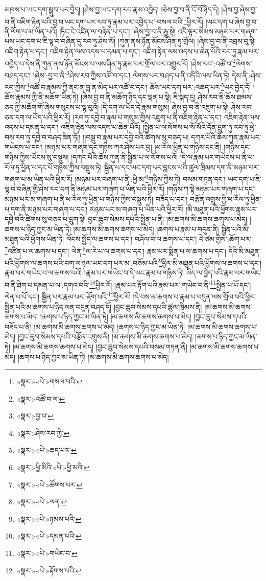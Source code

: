 མཁས་པ་ཡང་དག་སྒྲུབ་པར་བྱེད། །ཤེས་བྱ་ཡང་དག་རབ་རྣམ་འབྱེད། །ཅེས་བྱ་བ་ནི་ངོ་བོ་ཉིད་དེ། །ཤེས་བྱ་ཞེས་བྱ་བ་ནི་འཇིག་རྟེན་པའི་བྱ་བ་ཡང་དག་པར་རབ་ཏུ་རྣམ་པར་འབྱེད་པ་:བསལ་བའི་\footnote{«སྣར་»«པེ་»གསལ་བའི་}ཕྱིར་རོ། །ཡང་དག་པ་ཞེས་བྱ་བ་ནི་ལོག་པ་མ་ཡིན་པའོ། །ཏིང་ངེ་འཛིན་ལ་བརྟེན་པ་དང་། །ཞེས་བྱ་བ་ནི་རྒྱུ་སྟེ། འདི་ལྟར་སེམས་མཉམ་པར་གཞག་པས་ཡང་དག་པ་ཇི་ལྟ་བ་བཞིན་དུ་རབ་ཏུ་ཤེས་སོ། །ཀུན་ནས་ཉོན་མོངས་ཤིན་ཏུ་གྲོལ། །ཞེས་བྱ་བ་ནི་འབྲས་བུ་སྟེ། འཇིག་རྟེན་པ་དང་། འཇིག་རྟེན་ལས་འདས་པ་དམན་པ་དང་། འཇིག་རྟེན་ལས་འདས་པ་ཆེན་པོའི་རབ་ཏུ་རྣམ་པར་འབྱེད་པ་དེས་ནི་ཀུན་ནས་ཉོན་མོངས་པ་ལས་ཤིན་ཏུ་རྣམ་པར་གྲོལ་བར་འགྱུར་རོ། །ཤེས་རབ་:འཚོ་བ་\footnote{«སྣར་»འཚོ་བ་ལ་}ལེགས་བཤད་དང་། །ཞེས་:བྱ་བ་ནི་\footnote{«སྣར་»བྱ་བ་}ཤེས་རབ་ཀྱིས་འཚོ་བ་དང་། ལེགས་པར་བཤད་པ་ནི་འདིའི་ལས་ཡིན་ཏེ། དེས་ནི་:ཤེས་རབ་ཀྱིས་\footnote{«སྣར་»ཤེས་རབ་ཀྱི་}འཚོ་བ་རྣམས་ཀྱི་ནང་ན་བླ་ན་མེད་པར་འཚོ་བ་དང་། ཆོས་ཡང་དག་པར་:འཆད་པར་\footnote{«སྣར་»«པེ་»ཆད་པར་}ཡང་བྱེད་དོ། །ཆོས་རྣམས་ཀྱི་ནི་མཆོག་ཡིན་ཏེ། །ཞེས་བྱ་བ་ནི་མཆོག་ཉིད་དང་ལྡན་པ་སྟེ། ཇི་སྐད་དུ། ཤེས་རབ་ནི་ཆོས་ཐམས་ཅད་ཀྱི་མཆོག་གོ་ཞེས་གསུངས་པ་ལྟ་བུའོ། །དེ་དག་ལ་ཡོད་དེ་རྣམ་གསུམ། ཞེས་བྱ་བ་ནི་འཇུག་པ་སྟེ། ཤེས་རབ་ཅན་དག་ལ་ཡོད་པའི་ཕྱིར་རོ། །རབ་ཏུ་དབྱེ་བ་རྣམ་པ་གསུམ་གྱིས་འཇུག་པ་ནི་འཇིག་རྟེན་པ་དང་། འཇིག་རྟེན་ལས་འདས་པ་དམན་པ་དང་། འཇིག་རྟེན་ལས་འདས་པ་ཆེན་པོའོ། །སྦྱིན་པ་ལ་སོགས་པ་སོ་སོའི་དོན་དྲུག་ཏུ་རབ་ཏུ་ཕྱེ་བས་རབ་ཏུ་དབྱེ་བ་བཤད་ཟིན་ཏོ།། །།བསྡུ་བ་རྣམ་པར་དབྱེ་བའི་ཚིགས་སུ་བཅད་པ། དཀར་པོའི་ཆོས་ཀུན་རྣམ་པར་གཡེངས་པ་དང་། །མཉམ་པར་གཞག་དང་གཉིས་ཀར་ཤེས་པར་བྱ། །ཕ་རོལ་ཕྱིན་པ་གཉིས་དང་ནི། །གཉིས་དང་གཉིས་ཀྱིས་ཡོངས་སུ་བསྡུས། །དཀར་པོའི་ཆོས་ཀུན་ནི་སྦྱིན་པ་ལ་སོགས་པའོ། །དེ་ལ་རྣམ་པར་གཡེངས་པ་ནི་ཕ་རོལ་ཏུ་ཕྱིན་པ་དང་པོ་གཉིས་ཀྱིས་བསྡུས་ཏེ། སྦྱིན་པ་དང་ཡང་དག་པར་བླངས་པའི་ཚུལ་ཁྲིམས་དག་ནི་མཉམ་པར་གཞག་པ་མ་ཡིན་པའི་ཕྱིར་རོ། །མཉམ་པར་བཞག་པ་ནི་:ཕྱི་མ་\footnote{«སྣར་»ཕྱི་མིའི་«པེ་»ཕྱི་མའི་}གཉིས་ཀྱིས་ཏེ། བསམ་གཏན་དང་། ཡང་དག་པ་ཇི་ལྟ་བ་བཞིན་གྱི་ཤེས་རབ་དག་ནི་མཉམ་པར་གཞག་པ་ཡིན་པའི་ཕྱིར་རོ། །གཉིས་ཀ་སྟེ་མཉམ་པར་གཞག་པ་དང་། མཉམ་པར་མ་གཞག་པ་ནི་ཕ་རོལ་ཏུ་ཕྱིན་པ་གཉིས་ཀྱིས་བསྡུས་ཏེ། བཟོད་པ་དང་། བརྩོན་འགྲུས་ཀྱི་ཕ་རོལ་ཏུ་ཕྱིན་པ་དག་ནི་མཉམ་པར་གཞག་པ་དང་། མཉམ་པར་མ་གཞག་པ་ཡིན་པའི་ཕྱིར་རོ། །མི་མཐུན་པའི་ཕྱོགས་རྣམ་པར་དབྱེ་བའི་ཚིགས་སུ་བཅད་པ་དྲུག་སྟེ། བྱང་ཆུབ་སེམས་དཔའི་སྦྱིན་པ་ནི། །མ་ཆགས་མི་ཆགས་ཆགས་པ་མེད། །ཆགས་པ་ཉིད་ཀྱང་མ་ཡིན་ཏེ། །མ་ཆགས་མི་ཆགས་ཆགས་པ་མེད། །ཆགས་པ་རྣམ་པ་བདུན་ནི། སྦྱིན་པའི་མི་མཐུན་པའི་ཕྱོགས་ཡིན་ཏེ། ལོངས་སྤྱོད་ལ་ཆགས་པ་དང་། བཤོལ་བ་ལ་ཆགས་པ་དང་། དེ་ཙམ་གྱིས་:ཆོག་པར་\footnote{«སྣར་»«པེ་»ཚོགས་པར་}འཛིན་པ་ལ་ཆགས་པ་དང་། ལེན་\footnote{«སྣར་»«པེ་»ལན་}ལ་རེ་པ་ལ་ཆགས་པ་དང་། རྣམ་པར་སྨིན་པ་ལ་ཆགས་པ་དང་། དེའི་མི་མཐུན་པའི་ཕྱོགས་ལ་ཆགས་པའི་བག་ལ་ཉལ་ཡང་དག་པར་མ་:བཅོམ་པའི་\footnote{«སྣར་»«པེ་»ཉམས་པའི་}ཕྱིར་མི་མཐུན་པའི་ཕྱོགས་ལ་ཆགས་པ་དང་། རྣམ་པར་གཡེང་བ་ལ་ཆགས་པའོ། །རྣམ་པར་གཡེང་བ་དེ་ཡང་རྣམ་པ་གཉིས་ཏེ། ཡིད་ལ་བྱེད་པའི་རྣམ་པར་གཡེང་བ་ནི་ཐེག་པ་དམན་པ་ལ་:དགའ་བའི་\footnote{«སྣར་»«པེ་»དམན་པའི་}ཕྱིར་རོ། །རྣམ་པར་རྟོག་པའི་རྣམ་པར་:གཡེང་བ་ནི་\footnote{«སྣར་»«པེ་»གཡེང་བ་}སྦྱིན་པ་པོ་དང་། ལེན་པ་པོ་དང་། སྦྱིན་པར་རྣམ་པར་:རྟོག་པའི་\footnote{«སྣར་»«པེ་»རྟོགས་པའི་}ཕྱིར་རོ། །དེ་བས་ན་ཆགས་པ་རྣམ་པ་བདུན་ལས་གྲོལ་བའི་ཕྱིར་སྦྱིན་པའི་མ་ཆགས་པ་ཉིད་ལན་བདུན་བཤད་དོ། །བྱང་ཆུབ་སེམས་དཔའི་ཚུལ་ཁྲིམས་ནི། །མ་ཆགས་མི་ཆགས་ཆགས་པ་མེད། །ཆགས་པ་ཉིད་ཀྱང་མ་ཡིན་ཏེ། །མ་ཆགས་མི་ཆགས་ཆགས་པ་མེད། །བྱང་ཆུབ་སེམས་དཔའི་བཟོད་པ་ནི། །མ་ཆགས་མི་ཆགས་ཆགས་པ་མེད། །ཆགས་པ་ཉིད་ཀྱང་མ་ཡིན་ཏེ། །མ་ཆགས་མི་ཆགས་ཆགས་པ་མེད། །བྱང་ཆུབ་སེམས་དཔའི་བརྩོན་འགྲུས་ནི། །མ་ཆགས་མི་ཆགས་ཆགས་པ་མེད། །ཆགས་པ་ཉིད་ཀྱང་མ་ཡིན་ཏེ། །མ་ཆགས་མི་ཆགས་ཆགས་པ་མེད། །བྱང་ཆུབ་སེམས་དཔའི་བསམ་གཏན་ནི། །མ་ཆགས་མི་ཆགས་ཆགས་པ་མེད། །ཆགས་པ་ཉིད་ཀྱང་མ་ཡིན་ཏེ། །མ་ཆགས་མི་ཆགས་ཆགས་པ་མེད། 